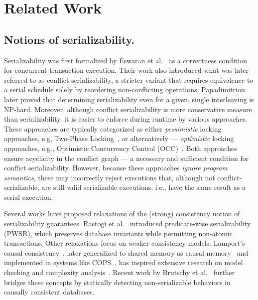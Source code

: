 \section{Related Work}
\label{sec:relatedWork}

\subsection{Notions of serializability.}
\label{sec:related:notions-of-serializability}


Serializability was first formalized by Eswaran et al.~\cite{EsGrKoTr76} as a correctness condition for concurrent transaction execution. Their work also introduced what was later referred to as conflict serializability, a stricter variant that requires equivalence to a serial schedule solely by reordering non-conflicting operations. Papadimitriou~\cite{Pa79, Pa86} later proved that determining serializability even for a given, single interleaving is NP-hard. 
%
Moreover, although conflict serializability is more conservative measure than serializability, it is easier to enforce during runtime by various approaches. 
%
These approaches are typically categorized as either \textit{pessimistic} locking approaches, e.g, Two-Phase Locking~\cite{BeHaGo87}, or alternatively --- \textit{optimistic} locking approaches, e.g., Optimistic Concurrency Control (OCC)~\cite{KuRo81, BuMo06}.
%
Both approaches ensure acyclicity in the conflict graph --- a necessary and sufficient condition for conflict serializability. However, because these approaches \textit{ignore program semantics}, these may incorrectly reject executions that, although not conflict-serializable, are still valid serializable executions, i.e., have the same result as a serial execution.
%

Several works have proposed relaxations of the (strong) consistency notion of serializability guarantees. Rastogi et al.~\cite{RaMeBrKoSi93} introduced predicate-wise serializability (PWSR), which preserves database invariants while permitting non-atomic transactions. 
%
Other relaxations focus on weaker consistency models: Lamport’s causal consistency~\cite{La78}, later generalized to shared memory as causal memory~\cite{AhNeBuKoHu95} and implemented in systems like COPS~\cite{LlFrKaAn11}, has inspired extensive research on model checking and complexity analysis~\cite{BoEnGuHa17,ZeBiBoEnEr19,LaBo20}. 
%
Recent work by Brutschy et al.~\cite{BrDiMuVe18} further bridges these concepts by statically detecting non-serializable behaviors in causally consistent databases.

